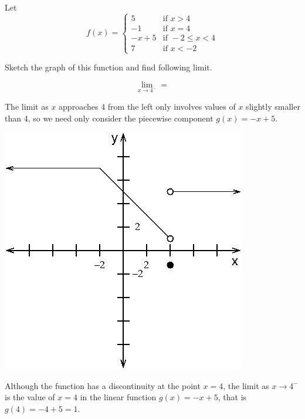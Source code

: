 \documentclass{ximera}
\author{Emma Smith Zbarsky}
\begin{document}
\begin{exercise}

Let
\[f(x) = \begin{cases} 5 & \mbox{if } x>4 \\ -1 & \mbox{if } x=4 \\ -x+5 & \mbox{if } -2\leq x < 4 \\ 7 & \mbox{if } x<-2 \end{cases}\]

Sketch the graph of this function and find following limit.

\[\lim_{x \to 4^-} = \]


\begin{hint}
The limit as $x$ approaches 4 from the left only involves values of $x$
slightly smaller than 4, so we need only consider the piecewise
component $g(x) = -x+5$.
\end{hint}


\begin{hint}
\begin{image}\includegraphics[width=.5\textwidth]{piecewise.jpg}\end{image}

 Although the function has a discontinuity at the
point $x=4$, the limit as $x\to4^-$ is the value of $x=4$ in the linear
function $g(x)=-x+5$, that is $g(4)=-4+5=1$.
\end{hint}


\begin{multipleChoice}
\end{multipleChoice}

\end{exercise}
\end{document}
